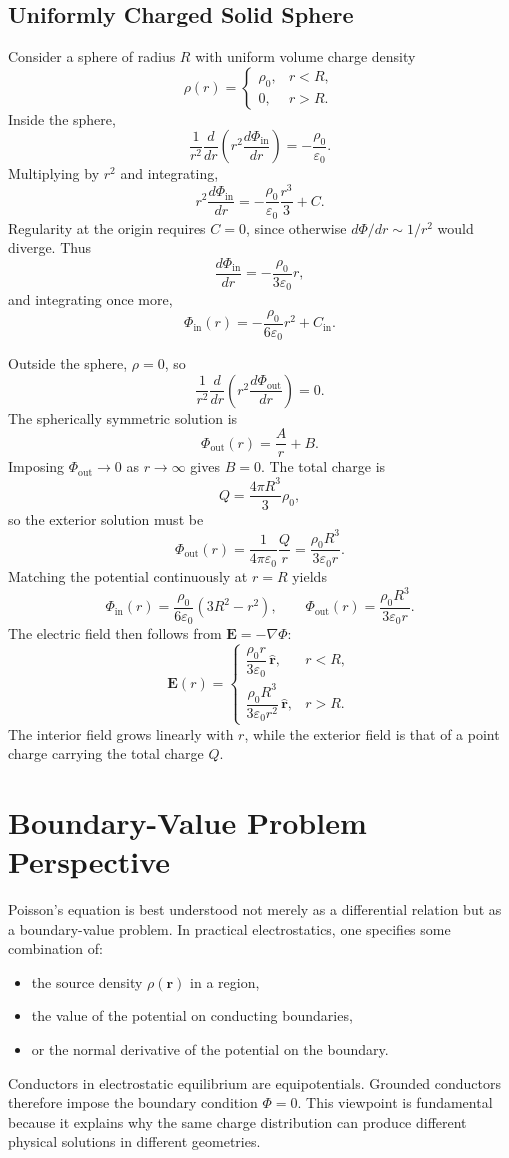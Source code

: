 \documentclass[12pt]{article}
\begin{document}
\subsection{Uniformly Charged Solid Sphere}
Consider a sphere of radius $R$ with uniform volume charge density
\[
\rho(r)=
\begin{cases}
\rho_0, & r<R,\\
0, & r>R.
\end{cases}
\]
Inside the sphere,
\[
\frac{1}{r^2}\frac{d}{dr}\left(r^2\frac{d\Phi_{\text{in}}}{dr}\right)
=
-\frac{\rho_0}{\varepsilon_0}.
\]
Multiplying by $r^2$ and integrating,
\[
r^2\frac{d\Phi_{\text{in}}}{dr}
=
-\frac{\rho_0}{\varepsilon_0}\frac{r^3}{3}+C.
\]
Regularity at the origin requires $C=0$, since otherwise $d\Phi/dr\sim 1/r^2$ would diverge. Thus
\[
\frac{d\Phi_{\text{in}}}{dr}=-\frac{\rho_0}{3\varepsilon_0}r,
\]
and integrating once more,
\[
\Phi_{\text{in}}(r)=-\frac{\rho_0}{6\varepsilon_0}r^2+C_{\text{in}}.
\]

Outside the sphere, $\rho=0$, so
\[
\frac{1}{r^2}\frac{d}{dr}\left(r^2\frac{d\Phi_{\text{out}}}{dr}\right)=0.
\]
The spherically symmetric solution is
\[
\Phi_{\text{out}}(r)=\frac{A}{r}+B.
\]
Imposing $\Phi_{\text{out}}\to 0$ as $r\to\infty$ gives $B=0$. The total charge is
\[
Q=\frac{4\pi R^3}{3}\rho_0,
\]
so the exterior solution must be
\[
\Phi_{\text{out}}(r)=\frac{1}{4\pi\varepsilon_0}\frac{Q}{r}
=
\frac{\rho_0R^3}{3\varepsilon_0 r}.
\]
Matching the potential continuously at $r=R$ yields
\[
\Phi_{\text{in}}(r)=\frac{\rho_0}{6\varepsilon_0}(3R^2-r^2),
\qquad
\Phi_{\text{out}}(r)=\frac{\rho_0R^3}{3\varepsilon_0 r}.
\]
The electric field then follows from $\mathbf E=-\nabla\Phi$:
\[
\mathbf E(r)=
\begin{cases}
\dfrac{\rho_0 r}{3\varepsilon_0}\,\hat{\mathbf r}, & r<R,\\[0.8em]
\dfrac{\rho_0 R^3}{3\varepsilon_0 r^2}\,\hat{\mathbf r}, & r>R.
\end{cases}
\]
The interior field grows linearly with $r$, while the exterior field is that of a point charge carrying the total charge $Q$.

\section{Boundary-Value Problem Perspective}
Poisson's equation is best understood not merely as a differential relation but as a boundary-value problem. In practical electrostatics, one specifies some combination of:
\begin{itemize}
\item the source density $\rho(\mathbf r)$ in a region,
\item the value of the potential on conducting boundaries,
\item or the normal derivative of the potential on the boundary.
\end{itemize}
Conductors in electrostatic equilibrium are equipotentials. Grounded conductors therefore impose the boundary condition $\Phi=0$. This viewpoint is fundamental because it explains why the same charge distribution can produce different physical solutions in different geometries.
\end{document}
